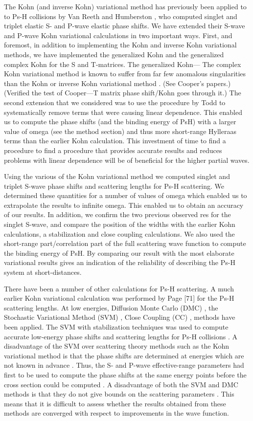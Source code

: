 \documentclass[preprint,showpacs,preprintnumbers,amsmath,amssymb]{revtex4}
\begin{document}
The Kohn (and inverse Kohn) variational method has previously been applied to
to Ps-H collisions by 
Van Reeth and Humberston \cite{VanReeth2003,VanReeth2004}, who computed singlet and triplet elastic
S- and P-wave elastic phase shifts. 
We have extended their S-wave and P-wave Kohn variational calculations in two important ways.
First, and foremost, in addition to implementing
the Kohn and inverse Kohn variational methods, we have
implemented the generalized Kohn and the generalized complex Kohn
for the S and T-matrices. The generalized Kohn---
The complex Kohn variational method is known to suffer
from far few anomalous singularities than the
Kohn or inverse Kohn variational method \cite{}. 
(See Cooper's papers.) (Verified the test of Cooper---T matrix
phase shift/Kohn goes through it.)
The second extension that we considered was to use
the procedure by Todd to systematically remove terms that
were causing linear dependence.
This enabled us to compute the phase shifts (and the binding
energy of PsH) with a larger value of omega (see the method section)
and thus more short-range Hylleraas terms than the earlier 
Kohn calculation. 
This investment of time to find a procedure to find
a procedure that provides accurate results
and reduces problems with linear dependence
will be of beneficial for the higher partial waves.

Using the various of the Kohn variational method we 
computed singlet and triplet S-wave 
phase shifts and scattering lengths for Ps-H scattering.
We determined these quantities for a number of values
of omega which enabled us to
extrapolate the results to infinite omega.
This enabled us to obtain an accuracy of our results.
In addition, we confirm the two previous observed res
for the singlet S-wave, and compare the
position of the widths with the earlier Kohn calculations,
a stabilization and close coupling calculations.
We also used the short-range part/correlation part of
the full scattering wave function to compute
the binding energy of PsH.
By comparing our result with the most elaborate
variational results gives an indication of the
reliability  of describing the Ps-H system
at short-distances.

There have been a number of other calculations for
Ps-H scattering. A much earlier Kohn variational calculation was performed
by Page [71] for the Ps-H scattering lengths.
At low energies, Diffusion Monte Carlo (DMC) \cite{},
the Stochastic  Variational Method (SVM) \cite{}, Close Coupling (CC) \cite{}, 
 methods have been applied.
The SVM with stabilization techniques was used to compute
accurate low-energy phase shifts and scattering lengths for Ps-H collisions \cite{}.
A disadvantage of the SVM over scattering theory methods
such as the Kohn variational method is that the phase shifts
are  determined at energies which  are not  known in advance \cite{}.
Thus,  the S- and P-wave
effective-range parameters had first to be used to compute the phase shifts at the same energy
points before the cross section could be computed \cite{}. 
A disadvantage of both the SVM 
and DMC  methods is that they do not  give
bounds on the scattering parameters \cite{}.
This means that it is difficult to assess whether the results
obtained from these methods are converged with respect
to improvements in the wave function.
\end{document}
